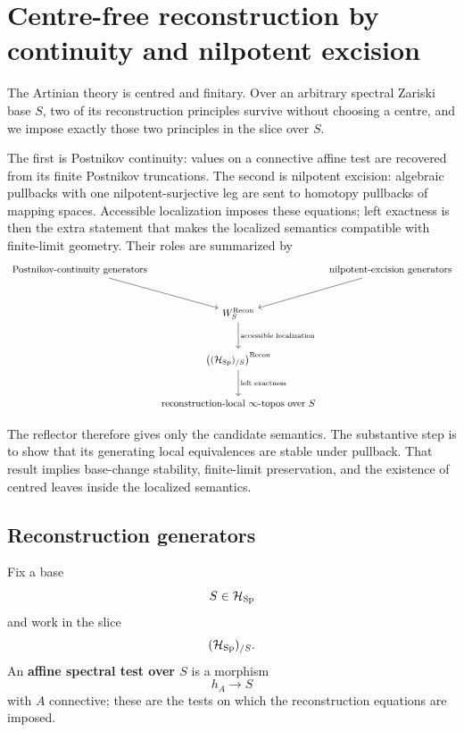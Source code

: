 \section{Centre-free reconstruction by continuity and nilpotent excision}
\label{sec:reconstruction-localization}

The Artinian theory is centred and finitary. Over an arbitrary spectral Zariski base
\(S\), two of its reconstruction principles survive without choosing a centre, and we
impose exactly those two principles in the slice over \(S\).

The first is Postnikov continuity: values on a connective affine test are recovered from
its finite Postnikov truncations. The second is nilpotent excision: algebraic pullbacks
with one nilpotent-surjective leg are sent to homotopy pullbacks of mapping spaces.
Accessible localization imposes these equations; left exactness is then the extra
statement that makes the localized semantics compatible with finite-limit geometry.
Their roles are summarized by
\[
\begin{tikzcd}[column sep=tiny,row sep=large]
    \text{Postnikov-continuity generators}
        \arrow[dr]
    &&
    \text{nilpotent-excision generators}
        \arrow[dl]
    \\
    & W^{\mathrm{Recon}}_S
        \arrow[d,"\text{accessible localization}"]
    &
    \\
    & \bigl((\mathcal H_{\Sp})_{/S}\bigr)^{\mathrm{Recon}}
        \arrow[d,"\text{left exactness}"]
    &
    \\
    & \text{reconstruction-local }\infty\text{-topos over }S
    &
\end{tikzcd}
\]

The reflector therefore gives only the candidate semantics. The substantive step is to
show that its generating local equivalences are stable under pullback. That result
implies base-change stability, finite-limit preservation, and the existence of centred
leaves inside the localized semantics.

\subsection{Reconstruction generators}

Fix a base
\[
    S\in\mathcal H_{\operatorname{Sp}}
\]
and work in the slice
\[
    (\mathcal H_{\operatorname{Sp}})_{/S}.
\]
An \textbf{affine spectral test over \(S\)} is a morphism
\[
    h_A\longrightarrow S
\]
with \(A\) connective; these are the tests on which the reconstruction equations are
imposed.

